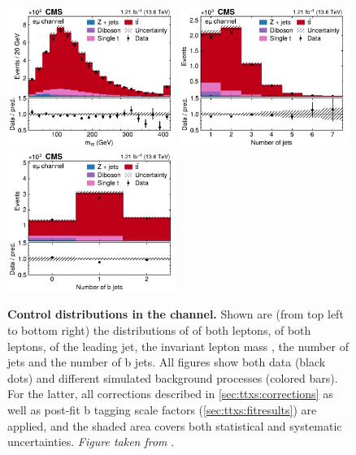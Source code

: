 \begin{figure}[!hp]
\hfill
\includegraphics[width=0.49\textwidth]{figures/ttxs/mll_em.pdf}
\includegraphics[width=0.49\textwidth]{figures/ttxs/njet_em.pdf}
\hfill
\includegraphics[width=0.49\textwidth]{figures/ttxs/nbtag_em.pdf}
\caption{
    \textbf{Control distributions in the \emu channel.} Shown are (from top left to bottom right) the distributions of \pt of both leptons, \abseta of both leptons, \pt of the leading jet, the invariant lepton mass \mll, the number of jets and the number of b jets. All figures show both data (black dots) and different simulated background processes (colored bars). For the latter, all corrections described in \cref{sec:ttxs:corrections} as well as post-fit b tagging scale factors (\cref{sec:ttxs:fitresults}) are applied, and the shaded area covers both statistical and systematic uncertainties. \textit{Figure taken from }.
}
\label{fig:ttxs:control_em}
\end{figure}

